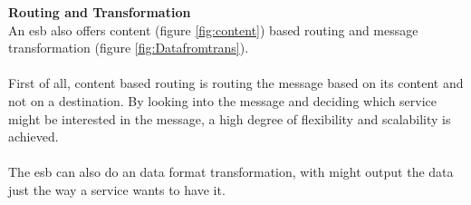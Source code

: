 \documentclass[12pt]{article}
\begin{document}
	\FloatBarrier
\newpage\noindent
\textbf{Routing and Transformation} \\
An \gls{esb} also offers content (figure \ref{fig:content}) %
based  routing and message transformation (figure \ref{fig:Datafromtrans}).\\\\
First of all, content based routing is routing the message based on its content and not on a destination. By looking into the message and deciding which service might be interested in the message, a high degree of flexibility and scalability is achieved.\\ %
\\The esb can also do an data format transformation, with might output the data just the way a service wants to have it.

	
	
	
\end{document}
